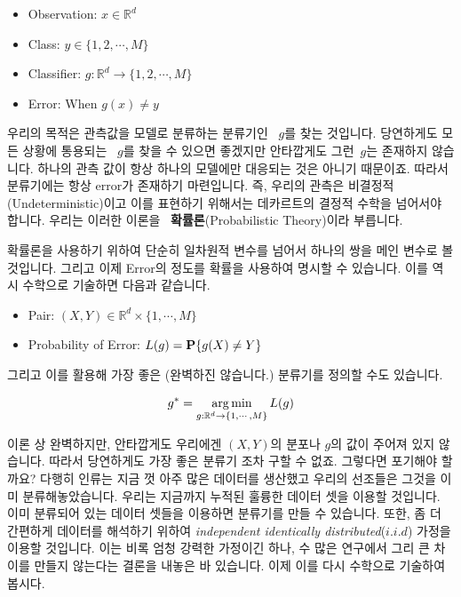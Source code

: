 \documentclass[final]{IEEEphot}
\begin{document}
\begin{itemize}
    \item Observation: $x \in \mathbb{R}^d$
    \item Class: $y \in \{1,2,\cdots,M\}$
    \item Classifier: $g: \mathbb{R}^d \rightarrow \{1,2,\cdots,M\}$
    \item Error: When $g(x) \neq y$
\end{itemize}

\HS 우리의 목적은 관측값을 모델로 분류하는 분류기인  $g$​를 찾는 것입니다. 
당연하게도 모든 상황에 통용되는  $g$​를 찾을 수 있으면 좋겠지만 안타깝게도 그런 ​ $g$​는 존재하지 않습니다. 
하나의 관측 값이 항상 하나의 모델에만 대응되는 것은 아니기 때문이죠. 따라서 분류기에는 항상 error가 존재하기 마련입니다. 
즉, 우리의 관측은 비결정적(Undeterministic)이고 이를 표현하기 위해서는 데카르트의 결정적 수학을 넘어서야 합니다. 
우리는 이러한 이론을  \textbf{확률론}(Probabilistic Theory)이라 부릅니다.

\VS

\HS 확률론을 사용하기 위하여 단순히 일차원적 변수를 넘어서 하나의 쌍을 메인 변수로 볼 것입니다. 
그리고 이제 Error의 정도를 확률을 사용하여 명시할 수 있습니다. 이를 역시 수학으로 기술하면 다음과 같습니다.

\begin{itemize}
    \item Pair: $(X,Y) \in \mathbb{R}^d \times \{1,\cdots,M\}$
    \item Probability of Error: $L(g) = \P\{g(X)\neq Y\}$
\end{itemize}

그리고 이를 활용해 가장 좋은 (완벽하진 않습니다.) 분류기를 정의할 수도 있습니다.

\begin{equation}
    g^* = \argmin_{g:\mathbb{R}^d \rightarrow \{1,\cdots,M\}} L(g)
\end{equation}

이론 상 완벽하지만, 안타깝게도 우리에겐 $(X,Y)$의 분포나 $g$의 값이 주어져 있지 않습니다.
따라서 당연하게도 가장 좋은 분류기 조차 구할 수 없죠. 그렇다면 포기해야 할까요?
다행히 인류는 지금 껏 아주 많은 데이터를 생산했고 우리의 선조들은 그것을 이미 분류해놓았습니다.
우리는 지금까지 누적된 훌륭한 데이터 셋을 이용할 것입니다. 이미 분류되어 있는 데이터 셋들을 이용하면 분류기를 만들 수 있습니다. 또한, 좀 더 간편하게 데이터를 해석하기 위하여 \textit{independent identically distributed}($i.i.d$) 가정을 이용할 것입니다. 이는 비록 엄청 강력한 가정이긴 하나, 수 많은 연구에서 그리 큰 차이를 만들지 않는다는 결론을 내놓은 바 있습니다.
이제 이를 다시 수학으로 기술하여 봅시다.
\end{document}
